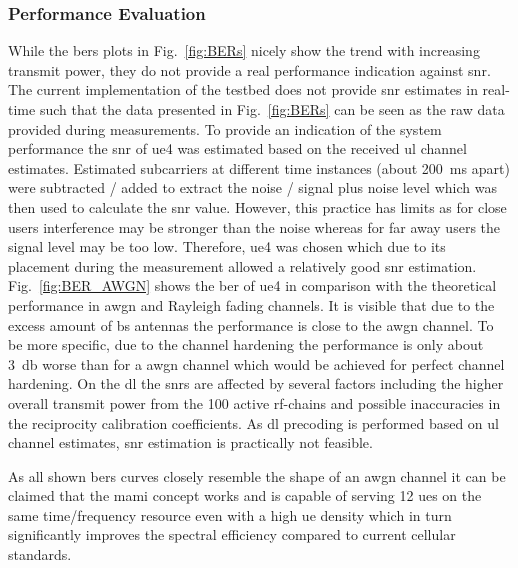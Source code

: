 \documentclass[journal]{IEEEtran}
\begin{document}
\subsubsection{Performance Evaluation}
While the \glspl{ber} plots in Fig.~\ref{fig:BERs} nicely show the trend with increasing transmit power, they do not provide a real performance indication against \gls{snr}. 
The current implementation of the testbed does not provide \gls{snr} estimates in real-time such that the data presented in Fig.~\ref{fig:BERs} can be seen as the raw data provided during measurements.
To provide an indication of the system performance the \gls{snr} of \gls{ue}4 was estimated based on the received \gls{ul} channel estimates.
Estimated subcarriers at different time instances (about \SI{200}{\milli\second} apart) were subtracted / added to extract the noise / signal plus noise level which was then used to calculate the \gls{snr} value.
However, this practice has limits as for close users interference may be stronger than the noise whereas for far away users the signal level may be too low.
Therefore, \gls{ue}4 was chosen which due to its placement during the measurement allowed a relatively good \gls{snr} estimation.
Fig.~\ref{fig:BER_AWGN} shows the \gls{ber} of \gls{ue}4 in comparison with the theoretical performance in \gls{awgn} and Rayleigh fading channels.
It is visible that due to the excess amount of \gls{bs} antennas the performance is close to the \gls{awgn} channel. 
To be more specific, due to the channel hardening the performance is only about \SI{3}{\decibel} worse than for a \gls{awgn} channel which would be achieved for perfect channel hardening.
On the \gls{dl} the \glspl{snr} are affected by several factors including the higher overall transmit power from the 100 active \gls{rf}-chains and possible inaccuracies in the reciprocity calibration coefficients.
As \gls{dl} precoding is performed based on \gls{ul} channel estimates, \gls{snr} estimation is practically not feasible.

As all shown \glspl{ber} curves closely resemble the shape of an \gls{awgn} channel it can be claimed that the \gls{mami} concept works and is capable of serving 12 \glspl{ue} on the same time/frequency resource even with a high \gls{ue} density which in turn significantly improves the spectral efficiency compared to current cellular standards.
 

%
%
\end{document}
